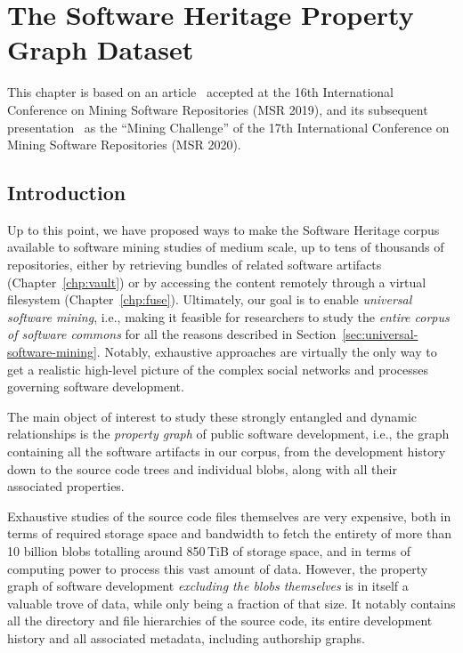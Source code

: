\chapter{The Software Heritage Property Graph Dataset}
\label{chp:graph-dataset}

This chapter is based on an article~\cite{swh-msr2019-dataset} accepted at the
16th International Conference on Mining Software Repositories (MSR 2019), and
its subsequent presentation~\cite{msr-2020-challenge} as the ``Mining
Challenge'' of the 17th International Conference on Mining Software
Repositories (MSR 2020).

\section{Introduction}

Up to this point, we have proposed ways to make the Software Heritage corpus
available to software mining studies of medium scale, up to tens of thousands
of repositories, either by retrieving bundles of related software artifacts
(Chapter~\ref{chp:vault}) or by accessing the content remotely through a
virtual filesystem (Chapter~\ref{chp:fuse}). Ultimately, our goal is to enable
\emph{universal software mining}, i.e., making it feasible for researchers to
study the \emph{entire corpus of software commons} for all the reasons
described in Section~\ref{sec:universal-software-mining}. Notably, exhaustive
approaches are virtually the only way to get a realistic high-level picture of
the complex social networks and processes governing software development.

The main object of interest to study these strongly entangled and dynamic
relationships is the \emph{property graph} of public software development,
i.e., the graph containing all the software artifacts in our corpus, from the
development history down to the source code trees and individual blobs, along
with all their associated properties.

Exhaustive studies of the source code files themselves are very expensive, both
in terms of required storage space and bandwidth to fetch the entirety of more
than 10 billion blobs totalling around 850\,TiB of storage space, and in terms
of computing power to process this vast amount of data. However, the property
graph of software development \emph{excluding the blobs themselves} is in
itself a valuable trove of data, while only being a fraction of that size.
It notably contains all the directory and file hierarchies of the source code,
its entire development history and all associated metadata, including
authorship graphs.

